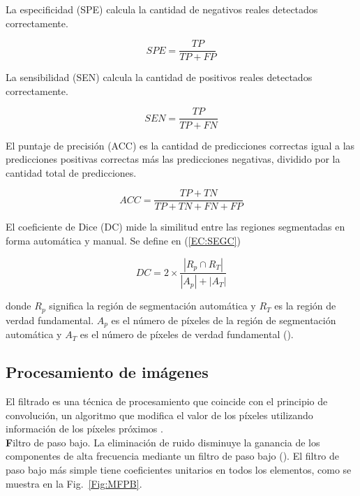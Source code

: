\documentclass[11pt,a4paper,openany]{article}
\begin{document}
        La especificidad (SPE) calcula la cantidad de negativos reales detectados correctamente.

        \begin{equation}\label{EC:SPE}
            SPE=\frac{TP}{TP+FP}
        \end{equation}

        La sensibilidad (SEN) calcula la cantidad de positivos reales detectados correctamente.

        \begin{equation} \label{EC:SEN}
            SEN=\frac{TP}{TP+FN}
        \end{equation}

        El puntaje de precisión (ACC) es la cantidad de predicciones correctas igual a las predicciones positivas correctas más las predicciones negativas, dividido por la cantidad total de predicciones.

        \begin{equation} \label{EC:ACC}
            ACC=\frac{TP+TN}{TP+TN+FN+FP}
        \end{equation}

        El coeficiente de Dice (DC) mide la similitud entre las regiones segmentadas en forma automática y manual. Se define en (\ref{EC:SEGC})

        \begin{equation} \label{EC:SEGC}
            DC= 2 \times \frac{\left|R_{p} \cap R_{T}\right|}{\left|A_{p}\right|+\left|A_{T}\right|}
        \end{equation}

        donde $R_p$ significa la región de segmentación automática y $R_T$ es la región de verdad fundamental. $A_{p}$ es el número de píxeles de la región de segmentación automática y $A_{T}$ es el número de píxeles de verdad fundamental (\cite{Hu2020}).
        
    \subsection{Procesamiento de imágenes}

    El filtrado es una técnica de procesamiento que coincide con el principio de convolución, un algoritmo que modifica el valor de los píxeles utilizando información de los píxeles próximos \cite{Esqueda2005}. \\

    {\textbf Filtro de paso bajo.} La eliminación de ruido disminuye la ganancia de los componentes de alta frecuencia mediante un filtro de paso bajo (\cite{Makandar2015}). El filtro de paso bajo más simple tiene coeficientes unitarios en todos los elementos, como se muestra en la Fig.~\ref{Fig:MFPB}. \\
\end{document}
